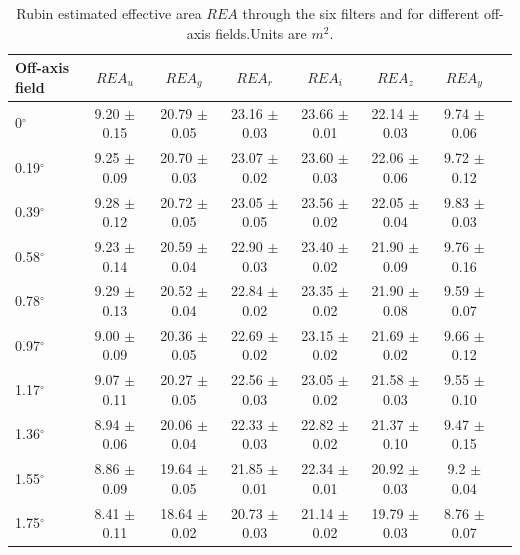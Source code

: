 \documentclass[SE,authoryear,toc]{lsstdoc}
\begin{document}
\begin{table}
\begin{center}
\begin{tabular}{p{1.4cm}*{7}{c}} \hline

Off-axis field & $REA_u$ & $REA_g$ & $REA_r$ & $REA_i$ & $REA_z$ & $REA_y$\\
\hline
0$^\circ$ & 9.20 $\pm$ 0.15 & 20.79 $\pm$ 0.05 & 23.16 $\pm$ 0.03 & 23.66 $\pm$  0.01 & 22.14 $\pm$  0.03 & 9.74 $\pm$ 0.06 \\
0.19$^\circ$ & 9.25 $\pm$  0.09 & 20.70 $\pm$  0.03 & 23.07 $\pm$  0.02 & 23.60 $\pm$ 0.03 & 22.06 $\pm$ 0.06 & 9.72  $\pm$ 0.12 \\
0.39$^\circ$ & 9.28 $\pm$  0.12 & 20.72 $\pm$  0.05 & 23.05 $\pm$  0.05 & 23.56 $\pm$  0.02 & 22.05 $\pm$ 0.04 & 9.83 $\pm$  0.03 \\
0.58$^\circ$ & 9.23 $\pm$ 0.14 & 20.59 $\pm$  0.04 & 22.90 $\pm$  0.03 & 23.40 $\pm$ 0.02 & 21.90 $\pm$ 0.09 & 9.76  $\pm$  0.16 \\
0.78$^\circ$ & 9.29 $\pm$  0.13 & 20.52 $\pm$  0.04 &22.84  $\pm$  0.02 & 23.35 $\pm$  0.02 & 21.90 $\pm$ 0.08 & 9.59 $\pm$  0.07 \\
0.97$^\circ$ & 9.00 $\pm$  0.09 & 20.36 $\pm$  0.05 & 22.69 $\pm$  0.02 & 23.15 $\pm$  0.02 & 21.69 $\pm$ 0.02 & 9.66  $\pm$  0.12 \\
1.17$^\circ$ & 9.07 $\pm$  0.11 & 20.27 $\pm$  0.05 & 22.56 $\pm$  0.03 & 23.05 $\pm$  0.02 & 21.58 $\pm$ 0.03 & 9.55  $\pm$  0.10\\
1.36$^\circ$ & 8.94 $\pm$  0.06 & 20.06 $\pm$  0.04 & 22.33 $\pm$  0.03 & 22.82 $\pm$  0.02 & 21.37 $\pm$ 0.10 & 9.47  $\pm$  0.15\\
1.55$^\circ$ & 8.86 $\pm$  0.09 & 19.64 $\pm$  0.05 & 21.85 $\pm$  0.01 & 22.34 $\pm$  0.01 & 20.92 $\pm$ 0.03 & 9.2  $\pm$ 0.04\\
1.75$^\circ$ & 8.41  $\pm$ 0.11 & 18.64 $\pm$  0.02 & 20.73 $\pm$  0.03 & 21.14 $\pm$  0.02 & 19.79 $\pm$  0.03 & 8.76  $\pm$ 0.07\\


\hline
\end{tabular}
\caption{Rubin estimated effective area $REA$ through the six filters and for different off-axis fields.\label{eff_table} Units are $m^2$.}
 \end{center}
 \end{table}



\clearpage


\appendix
\end{document}
